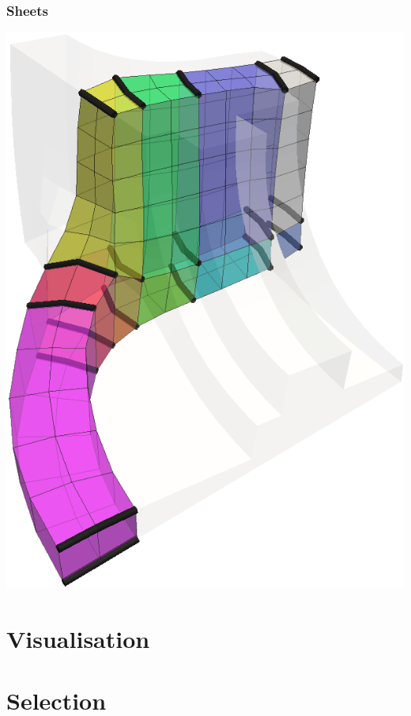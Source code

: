 \documentclass[12pt]{beamer}
\begin{document}
\begin{frame}[fragile]
  \frametitle{Sheets}
  \begin{center}
    \includegraphics[height=0.8\textheight]{./images/ex2-sheet1.png}
  \end{center}
\end{frame}

\section{Visualisation}


\section{Selection}
\end{document}

